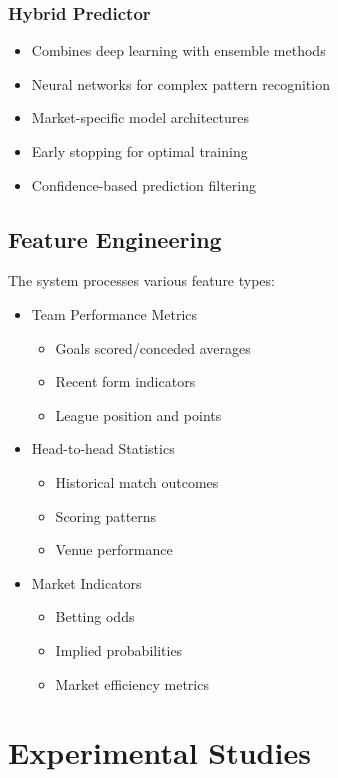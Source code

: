 \documentclass[conference]{IEEEtran}
\begin{document}
\subsubsection{Hybrid Predictor}
\begin{itemize}
    \item Combines deep learning with ensemble methods
    \item Neural networks for complex pattern recognition
    \item Market-specific model architectures
    \item Early stopping for optimal training
    \item Confidence-based prediction filtering
\end{itemize}

\subsection{Feature Engineering}
The system processes various feature types:
\begin{itemize}
    \item Team Performance Metrics
    \begin{itemize}
        \item Goals scored/conceded averages
        \item Recent form indicators
        \item League position and points
    \end{itemize}
    \item Head-to-head Statistics
    \begin{itemize}
        \item Historical match outcomes
        \item Scoring patterns
        \item Venue performance
    \end{itemize}
    \item Market Indicators
    \begin{itemize}
        \item Betting odds
        \item Implied probabilities
        \item Market efficiency metrics
    \end{itemize}
\end{itemize}

\section{Experimental Studies}
\end{document}
